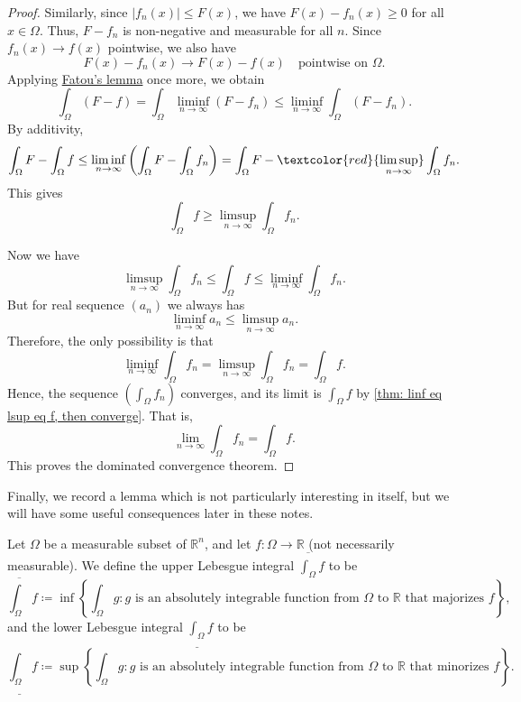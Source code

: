 \begin{proof}
    Similarly, since \(\vert f_n(x) \vert \le F(x) \), we have \(F(x) - f_n(x) \ge 0\) for all \(x \in \Omega\). Thus, \(F - f_n\) is non-negative and measurable for all \(n\). Since \(f_n(x) \to f(x)\) pointwise, we also have 
    \[
        F(x) - f_n(x) \to F(x) - f(x) \quad \text{pointwise on } \Omega. 
    \]     
    Applying \hyperref[lm: Fatou]{Fatou's lemma} once more, we obtain 
    \[
        \int _\Omega (F - f) = \int _\Omega \liminf_{n \to \infty} \left( F - f_n  \right) \le \liminf_{n \to \infty} \int _\Omega (F - f_n).  
    \] 
    By additivity,
    \[
        \int _\Omega F - \int _\Omega f \le \liminf_{n \to \infty} \left( \int _\Omega F - \int _\Omega f_n \right) = \int _\Omega F - \textcolor{red}{\limsup_{n \to \infty}} \int _\Omega f_n.   
    \]
    This gives 
    \[
        \int _\Omega f \ge \limsup_{n \to \infty} \int _\Omega f_n. 
    \]
    
    Now we have 
    \[
        \limsup_{n \to \infty} \int _\Omega f_n \le \int _\Omega f \le \liminf_{n \to \infty} \int _\Omega f_n.  
    \]
    But for real sequence \((a_n)\)  we always has 
    \[
      \liminf_{n \to \infty} a_n \le \limsup_{n \to \infty} a_n.    
    \]
    Therefore, the only possibility is that
    \[
        \liminf_{n \to \infty} \int _\Omega f_n = \limsup_{n \to \infty} \int _\Omega f_n = \int _\Omega f.  
    \]
    Hence, the sequence \((\int _\Omega f_n)\) converges, and its limit is \(\int _\Omega f\) by \autoref{thm: linf eq lsup eq f, then converge}. That is, 
    \[
        \lim_{n \to \infty} \int _\Omega f_n = \int _\Omega f. 
    \] 
    This proves the dominated convergence theorem.
\end{proof}

Finally, we record a lemma which is not particularly interesting in itself, but we will have some useful consequences later in these notes. 

\begin{definition}
    Let \(\Omega\) be a measurable subset of \(\mathbb{R} ^n\), and let \(f: \Omega \to \mathbb{R}\) (not necessarily measurable). We define the upper Lebesgue integral \(\overline{\int _\Omega} f\) to be 
    \[
        \overline{\int _\Omega } f \coloneqq \inf \left\{ \int _\Omega g: g \text{ is an absolutely integrable function from } \Omega \text{ to } \mathbb{R} \text{ that majorizes } f    \right\}, 
    \]    
    and the lower Lebesgue integral \(\underline{\int _\Omega} f\) to be 
    \[
        \underline{\int _\Omega} f \coloneqq \sup \left\{ \int _\Omega g: g \text{ is an absolutely integrable function from } \Omega \text{ to } \mathbb{R} \text{ that minorizes } f  \right\}.
    \] 
\end{definition}

